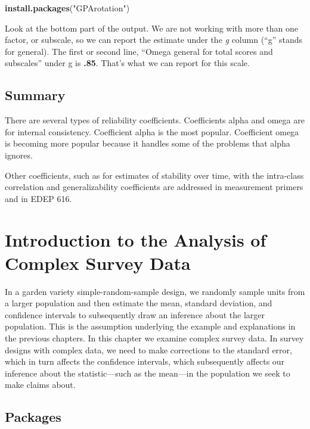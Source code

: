 \documentclass[
]{article}
\newenvironment{Shaded}{\begin{snugshade}}{\end{snugshade}}
\newcommand{\KeywordTok}[1]{\textcolor[rgb]{0.13,0.29,0.53}{\textbf{#1}}}
\newcommand{\NormalTok}[1]{#1}
\newcommand{\StringTok}[1]{\textcolor[rgb]{0.31,0.60,0.02}{#1}}
\begin{document}
\begin{Shaded}
\begin{Highlighting}[]
\KeywordTok{install.packages}\NormalTok{(}\StringTok{"GPArotation"}\NormalTok{)}
\end{Highlighting}
\end{Shaded}

Look at the bottom part of the output. We are not working with more than one factor, or subscale, so we can report the estimate under the \emph{g} column (``g'' stands for general). The first or second line, ``Omega general for total scores and subscales'' under g is \textbf{.85}. That's what we can report for this scale.

\hypertarget{summary-1}{%
\subsection{Summary}\label{summary-1}}

There are several types of reliability coefficients. Coefficients alpha and omega are for internal consistency. Coefficient alpha is the most popular. Coefficient omega is becoming more popular because it handles some of the problems that alpha ignores.

Other coefficients, such as for estimates of stability over time, with the intra-class correlation and generalizability coefficients are addressed in measurement primers and in EDEP 616.

\hypertarget{Complex}{%
\section{Introduction to the Analysis of Complex Survey Data}\label{Complex}}

In a garden variety simple-random-sample design, we randomly sample units from a larger population and then estimate the mean, standard deviation, and confidence intervals to subsequently draw an inference about the larger population. This is the assumption underlying the example and explanations in the previous chapters. In this chapter we examine complex survey data. In survey designs with complex data, we need to make corrections to the standard error, which in turn affects the confidence intervals, which subsequently affects our inference about the statistic---such as the mean---in the population we seek to make claims about.

\hypertarget{packages}{%
\subsection{Packages}\label{packages}}
\end{document}
